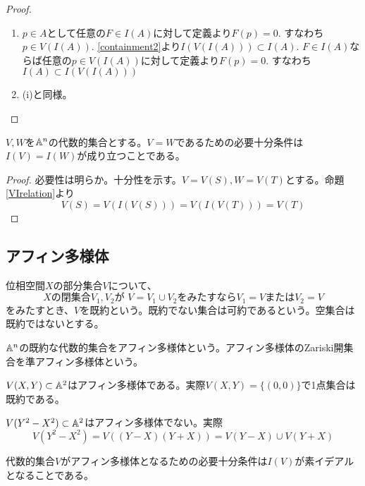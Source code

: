 \documentclass{ltjsreport}
\begin{document}
\begin{proof}
  \begin{enumerate}
    \item $p\in A$として任意の$F\in I(A)$に対して定義より$F(p)=0$. すなわち$p\in V(I(A))$. \ref{containment2}より$I(V(I(A)))\subset I(A)$. $F\in I(A)$ならば任意の$p\in V(I(A))$に対して定義より$F(p)=0$. すなわち$I(A)\subset I(V(I(A)))$
    \item (i)と同様。
  \end{enumerate}
\end{proof}

\begin{prop}
  $V,W$を$\mathbb{A}^n$の代数的集合とする。$V=W$であるための必要十分条件は$I(V)=I(W)$が成り立つことである。
\end{prop}

\begin{proof}
  必要性は明らか。十分性を示す。$V=V(S), W=V(T)$とする。命題\ref{VIrelation}より
  \[
  V(S)=V(I(V(S)))=V(I(V(T)))=V(T)
  \]
\end{proof}





\subsection{アフィン多様体}

\begin{defin}
  位相空間$X$の部分集合$V$について、
  \[
  \text{$X$の閉集合$V_1,V_2$が }V=V_1\cup V_2\text{をみたすなら$V_1=V$または$V_2=V$}  
  \]
  をみたすとき、$V$を既約という。既約でない集合は可約であるという。空集合は既約ではないとする。
\end{defin}

\begin{defin}
  $\mathbb{A}^n$の既約な代数的集合をアフィン多様体という。アフィン多様体のZariski開集合を準アフィン多様体という。
\end{defin}

\begin{eg}
  $V(X,Y)\subset\mathbb{A}^2$はアフィン多様体である。実際$V(X,Y)=\{(0,0)\}$で1点集合は既約である。
\end{eg}

\begin{eg}
  $V(Y^2-X^2)\subset \mathbb{A}^2$はアフィン多様体でない。実際
  \[
  V(Y^2-X^2)=V((Y-X)(Y+X))=V(Y-X)\cup V(Y+X)
  \]
\end{eg}

\begin{prop}\label{prime_affine}
  代数的集合$V$がアフィン多様体となるための必要十分条件は$I(V)$が素イデアルとなることである。
\end{prop}
\end{document}
